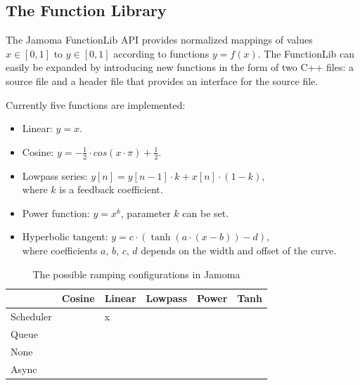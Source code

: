 \documentclass{article}
\begin{document}


\subsection{The Function Library} %
\label{sec:functionlib}
The Jamoma FunctionLib API provides normalized mappings of values $x \in [0,1]$ to $y \in [0,1]$ according to functions $y = f(x)$. The FunctionLib can easily be expanded by introducing new functions in the form of two C++ files: a source file and a header file that provides an interface for the source file.

Currently five functions are implemented: 

\begin{itemize}
	\item Linear: $y = x$.
	\item Cosine: $y = - \frac{1}{2} \cdot cos(x \cdot \pi ) + \frac{1}{2} $.
	\item Lowpass series: $y[n] = y[n-1] \cdot k + x[n] \cdot (1-k)$, \\ where $k$ is a feedback coefficient.
	\item Power function: $ y = x^{k} $, parameter $k$ can be set.
	\item Hyperbolic tangent: $ y = c \cdot (\tanh(a\cdot(x-b)) - d) $, \\ where coefficients $a$, $b$, $c$, $d$ depends on the width and offset of the curve.
\end{itemize}



\begin{table}
\begin{center}
\begin{tabular}{|l|l|l|l|l|l|}
\hline
          & Cosine & Linear & Lowpass & Power & Tanh \\
\hline
Scheduler &        &   x    &         &       & \\
\hline
Queue	  &        &        &         &       & \\
\hline
None	  &        &        &         &       & \\
\hline
Async	  &        &        &         &       & \\
\hline
\end{tabular}
\end{center}
\caption{The possible ramping configurations in Jamoma}
\label{tab:ramp_possibilities} %
\end{table}
\end{document}
